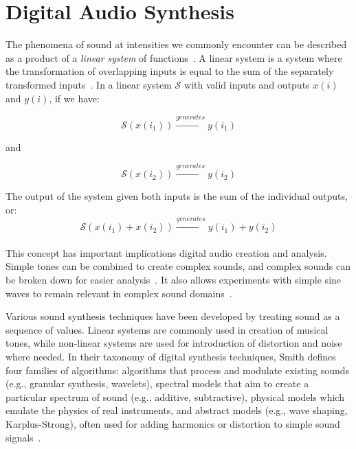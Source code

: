 \documentclass[\main/thesis.tex]{subfiles}
\begin{document}
\section{Digital Audio Synthesis}
\label{sec_digital_synthesis}
The phenomena of sound at intensities we commonly encounter can be described as a product of a \textit{linear system} of functions~\cite{cook1999chap4}. A linear system is a system where the transformation of overlapping inputs is equal to the sum of the separately transformed inputs~\cite{lyons2004understandingChap1,cook1999chap4}. In a linear system $\mathcal{S}$ with valid inputs and outputs $x(i)$ and $y(i)$, if we have:

\begin{equation}
 \mathcal{S}(x(i_1)) \xrightarrow{generates} y(i_1)
\end{equation}
\begin{center}
    and
\end{center}
\begin{equation}
\mathcal{S}(x(i_2)) \xrightarrow{generates}y(i_2)
\end{equation}

The output of the system given both inputs is the sum of the individual outputs, or:
\begin{equation}
 \mathcal{S}(x(i_1)+x(i_2)) \xrightarrow{generates} y(i_1)+y(i_2) 
\end{equation}
\\
This concept has important implications digital audio creation and analysis. Simple tones can be combined to create complex sounds, and complex sounds can be broken down for easier analysis~\cite{lyons2004understandingChap1}. It also allows experiments with simple sine waves to remain relevant in complex sound domains~\cite{cook1999chap4}.


Various sound synthesis techniques have been developed by treating sound as a sequence of values. Linear systems are commonly used in creation of musical tones, while non-linear systems are used for introduction of distortion and noise where needed. In their taxonomy of digital synthesis techniques, Smith defines four families of algorithms: algorithms that process and modulate existing sounds (e.g., granular synthesis, wavelets), spectral models that aim to create a particular spectrum of sound (e.g., additive, subtractive), physical models which emulate the physics of real instruments, and abstract models (e.g., wave shaping, Karplus-Strong), often used for adding harmonics or distortion to simple sound signals~\cite{smith1991viewpoints}. 
\end{document}
